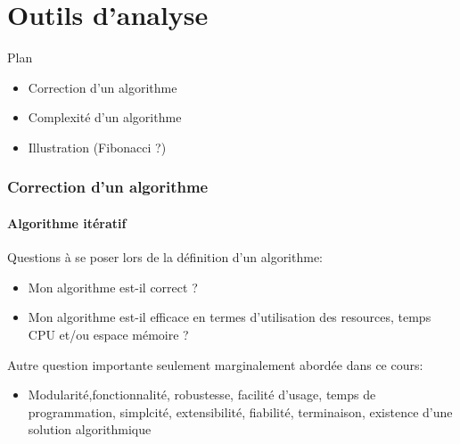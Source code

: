 
\part{Outils d'analyse}



\begin{frame}{Plan}

\begin{itemize}
\item Correction d'un algorithme
\item Complexité d'un algorithme
\item Illustration (Fibonacci ?)
\end{itemize}

\end{frame}

\section{Correction d'un algorithme}

\subsection{Algorithme itératif}

\begin{frame}
Questions à se poser lors de la définition d'un algorithme:
\begin{itemize}
\item Mon algorithme est-il correct ?
\item Mon algorithme est-il efficace en termes d'utilisation des
  resources, temps CPU et/ou espace mémoire ?
\end{itemize}

Autre question importante seulement marginalement abordée dans ce cours:
\begin{itemize}
\item Modularité,fonctionnalité, robustesse, facilité d'usage, temps
  de programmation, simplcité, extensibilité, fiabilité, terminaison,
  existence d'une solution algorithmique
\end{itemize}

\end{frame}

